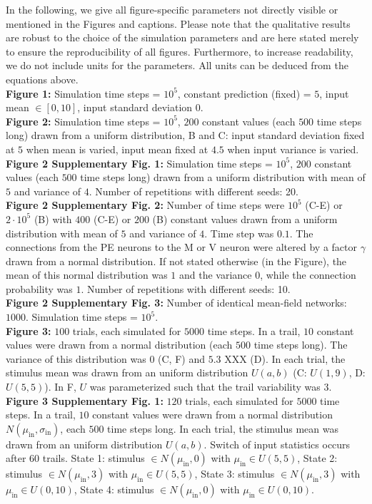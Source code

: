\documentclass[10pt,a4paper,draft]{article}
\begin{document}
In the following, we give all figure-specific parameters not directly visible or mentioned in the Figures and captions. Please note that the qualitative results are robust to the choice of the simulation parameters and are here stated merely to ensure the reproducibility of all figures. Furthermore, to increase readability, we do not include units for the parameters. All units can be deduced from the equations above.\newline\\ 
%
\textbf{Figure 1:} Simulation time steps = $10^5$, constant prediction (fixed) = $5$, input mean $\in [0,10]$, input standard deviation $0$.\\
%
\textbf{Figure 2:} Simulation time steps = $10^5$, $200$ constant values (each $500$ time steps long) drawn from a uniform distribution, B and C: input standard deviation fixed at $5$ when mean is varied, input mean fixed at $4.5$ when input variance is varied.\\
%
\textbf{Figure 2 Supplementary Fig. 1:} Simulation time steps = $10^5$, $200$ constant values (each $500$ time steps long) drawn from a uniform distribution with mean of $5$ and variance of $4$. Number of repetitions with different seeds: 20.\\
%
\textbf{Figure 2 Supplementary Fig. 2:} Number of time steps were $10^5$ (C-E) or $2\cdot 10^5$ (B) with $400$ (C-E) or $200$ (B) constant values drawn from a uniform distribution with mean of $5$ and variance of $4$. Time step was $0.1$. The connections from the PE neurons to the M or V neuron were altered by a factor $\gamma$ drawn from a normal distribution. If not stated otherwise (in the Figure), the mean of this normal distribution was $1$ and the variance $0$, while the connection probability was $1$. Number of repetitions with different seeds: 10.\\
%
\textbf{Figure 2 Supplementary Fig. 3:} Number of identical mean-field networks: $1000$.  Simulation time steps = $10^5$.\\
%
\textbf{Figure 3:} $100$ trials, each simulated for $5000$ time steps. In a trail, $10$ constant values were drawn from a normal distribution (each $500$ time steps long). The variance of this distribution was $0$ (C, F)  and $5.3$ XXX (D). In each trial, the stimulus mean was drawn from an uniform distribution $U(a, b)$ (C: $U(1,9)$, D: $U(5,5)$). In F, $U$ was parameterized such that the trail variability was $3$.\\
%
\textbf{Figure 3 Supplementary Fig. 1:}  $120$ trials, each simulated for $5000$ time steps. In a trail, $10$ constant values were drawn from a normal distribution $N(\mu_\mathrm{in}, \sigma_\mathrm{in})$, each $500$ time steps long. In each trial, the stimulus mean was drawn from an uniform distribution $U(a, b)$. Switch of input statistics occurs after 60 trails. State 1: stimulus $\in N(\mu_\mathrm{in}, 0)$ with $\mu_\mathrm{in} \in U(5,5)$, State 2:  stimulus $\in N(\mu_\mathrm{in}, 3)$ with $\mu_\mathrm{in} \in U(5,5)$, State 3: stimulus $\in N(\mu_\mathrm{in}, 3)$ with $\mu_\mathrm{in} \in U(0,10)$, State 4: stimulus $\in N(\mu_\mathrm{in}, 0)$ with $\mu_\mathrm{in} \in U(0,10)$.\\
\end{document}

